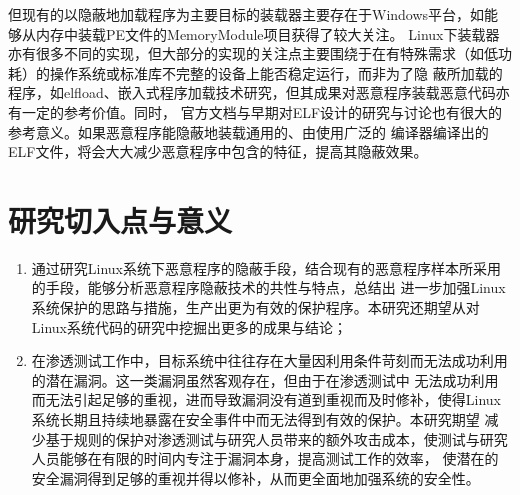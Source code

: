 但现有的以隐蔽地加载程序为主要目标的装载器主要存在于Windows平台，如能够从内存中装载PE文件的MemoryModule\cite{MemModule}项目获得了较大关注。
Linux下装载器亦有很多不同的实现，但大部分的实现的关注点主要围绕于在有特殊需求（如低功耗）的操作系统或标准库不完整的设备上能否稳定运行，而非为了隐
蔽所加载的程序，如elfload\cite{elfload}、嵌入式程序加载技术研究\cite{EmbedLoad}，但其成果对恶意程序装载恶意代码亦有一定的参考价值。同时，
官方文档\cite{ELFFormat}与早期对ELF设计的研究与讨论\cite{StudyElfReloc}也有很大的参考意义。如果恶意程序能隐蔽地装载通用的、由使用广泛的
编译器编译出的ELF文件，将会大大减少恶意程序中包含的特征，提高其隐蔽效果。

\section{研究切入点与意义}

\begin{enumerate}
\item 通过研究Linux系统下恶意程序的隐蔽手段，结合现有的恶意程序样本所采用的手段，能够分析恶意程序隐蔽技术的共性与特点，总结出
    进一步加强Linux系统保护的思路与措施，生产出更为有效的保护程序。本研究还期望从对Linux系统代码的研究中挖掘出更多的成果与结论；
\item 在渗透测试工作中，目标系统中往往存在大量因利用条件苛刻而无法成功利用的潜在漏洞。这一类漏洞虽然客观存在，但由于在渗透测试中
    无法成功利用而无法引起足够的重视，进而导致漏洞没有道到重视而及时修补，使得Linux系统长期且持续地暴露在安全事件中而无法得到有效的保护。本研究期望
    减少基于规则的保护对渗透测试与研究人员带来的额外攻击成本，使测试与研究人员能够在有限的时间内专注于漏洞本身，提高测试工作的效率，
    使潜在的安全漏洞得到足够的重视并得以修补，从而更全面地加强系统的安全性。
\end{enumerate}
